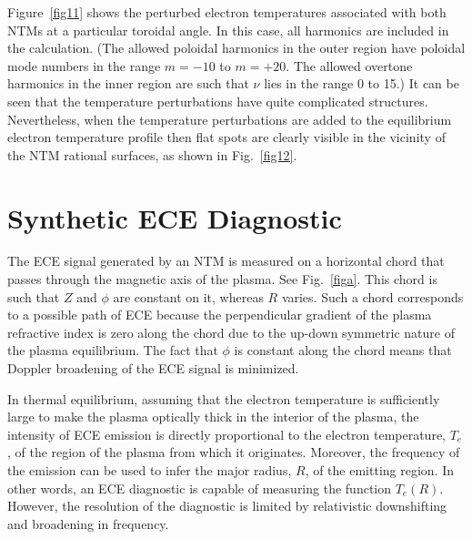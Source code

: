 \documentclass[12pt,prb,aps]{revtex4-1}
\begin{document}
Figure~\ref{fig11} shows
the perturbed electron temperatures associated with both NTMs at a particular toroidal angle. In this case, all harmonics are included in the calculation. (The allowed poloidal harmonics in the
outer region have poloidal mode numbers in the range $m=-10$ to $m=+20$. The allowed overtone harmonics in the inner region are such that
$\nu$ lies in the range $0$ to 15.) It can be seen that the temperature perturbations have quite complicated structures. Nevertheless, when the temperature perturbations are
added to the equilibrium electron temperature profile then flat spots are clearly visible in the vicinity of the NTM rational surfaces, as shown in Fig.~\ref{fig12}. 

\iffalse
\section{Synthetic ECE Diagnostic}\label{s6}
The ECE signal generated by an NTM is  measured on a horizontal chord that passes through the magnetic axis of the plasma. See Fig.~\ref{figa}. This chord
is such that $Z$ and $\phi$ are constant on it, whereas $R$ varies. Such a chord corresponds to a possible  path of ECE because 
the perpendicular gradient of the plasma refractive index is zero along the chord due to the up-down symmetric nature of the plasma equilibrium. The fact that $\phi$
is constant along the chord means that Doppler
broadening of the ECE signal is minimized.\cite{ece4a,ece5} 

In thermal equilibrium, assuming that the electron temperature is sufficiently large to make the plasma optically thick in the interior of the plasma, the intensity of ECE emission is directly proportional to the electron temperature, $T_e$,  of the region of the plasma from which it originates.\cite{ece1,ece2} Moreover, the frequency of the emission can be used to infer the major radius, $R$,  of the
emitting region. In other words, an ECE diagnostic is capable of measuring the function $T_e(R)$. However, the resolution of the diagnostic is limited by relativistic downshifting and 
broadening in frequency.   
\end{document}
